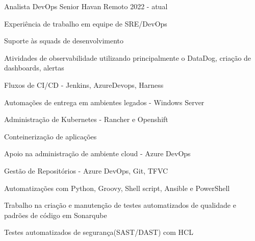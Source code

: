 

\begin{cventries}


  \cventry
    {Analista DevOps Senior} %
    {Havan} %
    {Remoto} %
    {2022 - atual} %
    {
      \begin{cvitems} %
        \item {Experiência de trabalho em equipe de SRE/DevOps}
        \item {Suporte às squads de desenvolvimento}
        \item {Atividades de observabilidade utilizando principalmente o DataDog, criação de dashboards, alertas}
        \item {Fluxos de CI/CD - Jenkins, AzureDevops, Harness}
        \item {Automações de entrega em ambientes legados - Windows Server}
        \item {Administração de Kubernetes - Rancher e Openshift}
        \item {Conteinerização de aplicações}
        \item {Apoio na administração de ambiente cloud - Azure DevOps}
        \item {Gestão de Repositórios - Azure DevOps, Git, TFVC}
        \item {Automatizações com Python, Groovy, Shell script, Ansible e PowerShell}
        \item {Trabalho na criação e manutenção de testes automatizados de qualidade e padrões de código em Sonarqube}
        \item {Testes automatizados de segurança(SAST/DAST) com HCL}
      \end{cvitems}
    }


\end{cventries}

